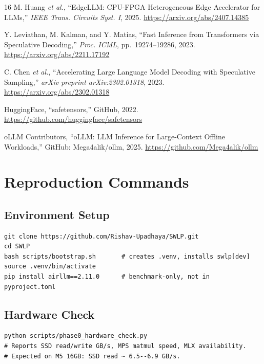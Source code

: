 \documentclass[10pt,a4paper]{article}
\newcommand{\etal}{\textit{et al.}}
\begin{document}
\begin{thebibliography}{16}
M. Huang \etal, ``EdgeLLM: CPU-FPGA Heterogeneous Edge Accelerator for LLMs,''
\textit{IEEE Trans. Circuits Syst. I}, 2025. \url{https://arxiv.org/abs/2407.14385}

Y. Leviathan, M. Kalman, and Y. Matias, ``Fast Inference from Transformers via
Speculative Decoding,'' \textit{Proc. ICML}, pp.\ 19274--19286, 2023.
\url{https://arxiv.org/abs/2211.17192}

C. Chen \etal, ``Accelerating Large Language Model Decoding with Speculative
Sampling,'' \textit{arXiv preprint arXiv:2302.01318}, 2023.
\url{https://arxiv.org/abs/2302.01318}

HuggingFace, ``safetensors,'' GitHub, 2022.
\url{https://github.com/huggingface/safetensors}

oLLM Contributors, ``oLLM: LLM Inference for Large-Context Offline Workloads,''
GitHub: Mega4alik/ollm, 2025. \url{https://github.com/Mega4alik/ollm}

\end{thebibliography}

\appendix

\section{Reproduction Commands}
\label{app:reproduction}

\subsection{Environment Setup}
\begin{lstlisting}
git clone https://github.com/Rishav-Upadhaya/SWLP.git
cd SWLP
bash scripts/bootstrap.sh       # creates .venv, installs swlp[dev]
source .venv/bin/activate
pip install airllm==2.11.0      # benchmark-only, not in pyproject.toml
\end{lstlisting}

\subsection{Hardware Check}
\begin{lstlisting}
python scripts/phase0_hardware_check.py
# Reports SSD read/write GB/s, MPS matmul speed, MLX availability.
# Expected on M5 16GB: SSD read ~ 6.5--6.9 GB/s.
\end{lstlisting}
\end{document}
